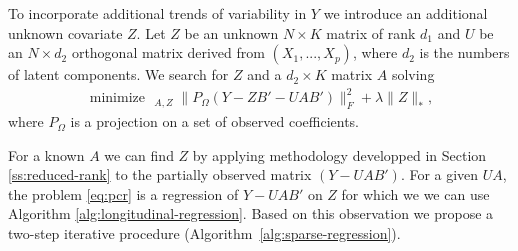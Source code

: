 \documentclass[preprint]{imsart}
\numberwithin{equation}{section}
\theoremstyle{plain}
\DeclareMathOperator*{\argmin}{arg\,min}
\DeclareMathOperator*{\minimize}{minimize\ \ }
\begin{document}
To incorporate additional trends of variability in $Y$ we introduce an additional unknown covariate $Z$. Let $Z$ be an unknown $N \times K$ matrix of rank $d_1$ and $U$ be an $N \times d_2$ orthogonal matrix derived from $(X_1,...,X_p)$, where $d_2$ is the numbers of latent components. We search for $Z$ and a $d_2 \times K$ matrix $A$ solving
\begin{align}\label{eq:pcr}
\minimize_{A,Z} \|P_\Omega(Y - ZB' - UAB')\|_F^2 + \lambda\|Z\|_*,
\end{align}
where $P_\Omega$ is a projection on a set of observed coefficients.

For a known $A$ we can find $Z$ by applying methodology developped in Section \ref{ss:reduced-rank} to the partially observed matrix $(Y - UAB')$. For a given $UA$, the problem \eqref{eq:pcr} is a regression of $Y - UAB'$ on $Z$ for which we we can use Algorithm \ref{alg:longitudinal-regression}. Based on this observation we propose a two-step iterative procedure (Algorithm~\ref{alg:sparse-regression}).



\end{document}
